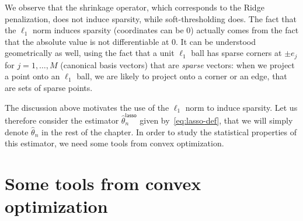\documentclass[
	fontsize=11pt, %
	twoside=false, %
	numbers=noenddot, %
]{kaobook}
\newcommand{\wh}{\widehat}
\begin{document}
We observe that the shrinkage operator, which corresponds to the Ridge penalization, does not induce sparsity, while soft-thresholding does.
The fact that the $\ell_1$ norm induces sparsity (coordinates can be 0) actually comes from the fact that the absolute value is not differentiable at $0$.
It can be understood geometrically as well, using the fact that a unit $\ell_1$ ball has sparse corners at $\pm e_j$ for $j=1, \ldots, M$ (canonical basis vectors) that are \emph{sparse} vectors: when we project a point onto an $\ell_1$ ball, we are likely to project onto a corner or an edge, that are sets of sparse points.




The discussion above motivates the use of the $\ell_1$ norm to induce sparsity.
Let us therefore consider the estimator $\wh \theta_n^{\mathsf{lasso}}$ given by~\eqref{eq:lasso-def}, that we will simply denote $\wh \theta_n$ in the rest of the chapter.
In order to study the statistical properties of this estimator, we need some tools from convex optimization.



\section{Some tools from convex optimization} %
\label{sec:some_tools_from_convex_optimization}
\end{document}
